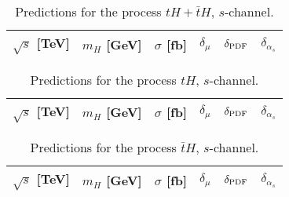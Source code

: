 \begin{table}
    \centering
    \begin{tabular}{cccccc}
        $\sqrt{s}$ [TeV]  &  $m_H$ [GeV]  &  $\sigma$ [fb]  & $\delta_{\mu}$   &  $\delta_{\rm PDF}$   & $\delta_{\alpha_s}$\\
        \hline
          
    \end{tabular}
    \caption{\label{tab:th-s-tot} Predictions for the process $tH + \bar t H$, $s$-channel.}
\end{table}
%
\begin{table}
    \centering
    \begin{tabular}{cccccc}
        $\sqrt{s}$ [TeV]  &  $m_H$ [GeV]  &  $\sigma$ [fb]  & $\delta_{\mu}$   &  $\delta_{\rm PDF}$   & $\delta_{\alpha_s}$\\
        \hline
          
    \end{tabular}
    \caption{\label{tab:th-s-top} Predictions for the process $tH$, $s$-channel.}
\end{table}
%
\begin{table}
    \centering
    \begin{tabular}{cccccc}
        $\sqrt{s}$ [TeV]  &  $m_H$ [GeV]  &  $\sigma$ [fb]  & $\delta_{\mu}$   &  $\delta_{\rm PDF}$   & $\delta_{\alpha_s}$\\
        \hline
          
    \end{tabular}
    \caption{\label{tab:th-s-atop} Predictions for the process $\bar tH$, $s$-channel.}
\end{table}
